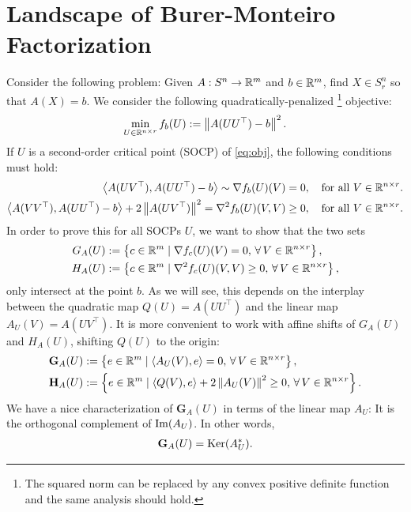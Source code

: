 \documentclass[11pt]{article}
\newcommand{\error}{e}
\begin{document}
\section{Landscape of Burer-Monteiro Factorization}
Consider the following problem: Given $A: S^n \rightarrow \mathbb{R}^m$ and
$b \in \mathbb{R}^m$, find $X \in S^n_r$ so that $A(X) = b$. We consider the following
quadratically-penalized \footnote{The squared norm can be replaced by any convex
  positive definite function and the same analysis should hold.} objective:
\begin{align} \label{eq:obj}
  \min_{U \in \mathbb{R}^{n \times r}} f_b(U) := \left\lVert A(UU^\top) - b \right\lVert^2.
\end{align}
If $U$ is a second-order critical point (SOCP) of \eqref{eq:obj}, the following
conditions must hold:
\begin{align}
  \label{eq:grad}
  \left\langle A(UV^\top), A(UU^\top) - b \right\rangle \sim \nabla f_b(U)(V) &= 0,\quad \text{for all } V \in \mathbb{R}^{n \times r}. \\
  \label{eq:hess}
  \left\langle A(VV^\top), A(UU^\top) - b \right\rangle + 2\left\lVert A(UV^\top) \right\lVert^2 = \nabla^2 f_b(U)(V, V) &\ge 0,\quad \text{for all } V \in \mathbb{R}^{n \times r}.
\end{align}
In order to prove this for all SOCPs $U$, we want to show that the two sets
\begin{align*}
  G_A(U) &:= \left\{ c \in \mathbb{R}^m \mid \nabla f_c(U)(V) = 0,\, \forall\, V \in \mathbb{R}^{n \times r} \right\}, \\
  H_A(U) &:= \left\{ c \in \mathbb{R}^m \mid \nabla^2 f_c(U)(V, V) \ge 0,\, \forall\, V \in \mathbb{R}^{n \times r} \right\},
\end{align*}
only intersect at the point $b$. As we will see, this depends on the interplay
between the quadratic map $Q(U) = A(UU^\top)$ and the linear map
$A_U(V) = A(UV^\top)$. It is more convenient to work with affine shifts of
$G_A(U)$ and $H_A(U)$, shifting $Q(U)$ to the origin:
\begin{align*}
  \textbf{G}_A(U)
  &:= \braces{\error \in \R^m \mid \dotp{A_U(V), \error} = 0,\, \forall\, V \in \R^{n \times r}}, \\
  \textbf{H}_A(U)
  &:= \braces{\error \in \R^m \mid \dotp{Q(V), \error} + 2 \norm{A_U(V)}^2 \ge 0,\, \forall\, V \in \R^{n \times r}}.
\end{align*}
We have a nice characterization of $\textbf{G}_A(U)$ in terms of the linear map
$A_U$: It is the orthogonal complement of $\operatorname{Im}(A_U)$. In other words,
\begin{align*}
  \textbf{G}_A(U) = \operatorname{Ker}(A_U^*).
\end{align*}
\end{document}
